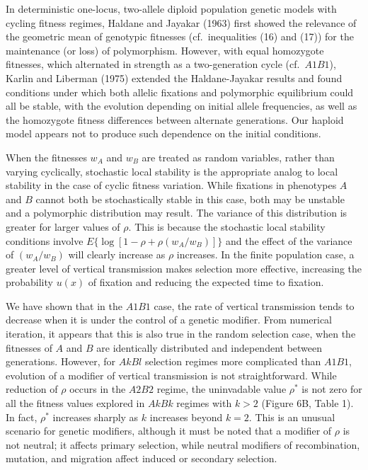 In deterministic one-locus, two-allele diploid population genetic models with cycling fitness regimes, Haldane and Jayakar (1963) first showed the relevance of the geometric mean of genotypic fitnesses (cf.\ inequalities (16) and (17)) for the maintenance (or loss) of polymorphism. However, with equal homozygote fitnesses, which alternated in strength as a two-generation cycle (cf.\ $A1B1$), Karlin and Liberman (1975) extended the Haldane-Jayakar results and found conditions under which both allelic fixations and polymorphic equilibrium could all be stable, with the evolution depending on initial allele frequencies, as well as the homozygote fitness differences between alternate generations. Our haploid model appears not to produce such dependence on the initial conditions.
 
 When the fitnesses $w_A$ and $w_B$ are treated as random variables, rather than varying cyclically, stochastic local stability is the appropriate analog to local stability in the case of cyclic fitness variation. While fixations in phenotypes $A$ and $B$ cannot both be stochastically stable in this case, both may be unstable and a polymorphic distribution may result. The variance of this distribution is greater for larger values of $\rho$. This is because the  stochastic local stability conditions involve $E\bigl\{\log[1-\rho+\rho(w_A/w_B)]\bigr\}$ and the effect of the variance of $(w_A/w_B)$ will clearly increase as $\rho$ increases. In the finite population case, a greater level of vertical transmission makes selection more effective, increasing the probability $u(x)$ of fixation and reducing the expected time to fixation.
 
 We have shown that in the $A1B1$ case, the rate of vertical transmission tends to decrease when it is under the control of a genetic modifier. From numerical iteration, it appears that this is also true in the random selection case, when the fitnesses of $A$ and $B$ are identically distributed and independent between generations. However, for $AkBl$ selection regimes more complicated than $A1B1$, evolution of a modifier of vertical transmission is not straightforward. While reduction of $\rho$ occurs in the $A2B2$ regime, the uninvadable value $\rho^*$ is not zero for all the fitness values explored in $AkBk$ regimes with $k>2$ (Figure 6B, Table 1). In fact, $\rho^*$ increases sharply as $k$ increases beyond $k=2$. This is an unusual scenario for genetic modifiers, although it must be noted that a modifier of $\rho$ is not neutral; it affects primary selection, while neutral  modifiers of recombination, mutation, and migration affect induced or secondary selection.
 
